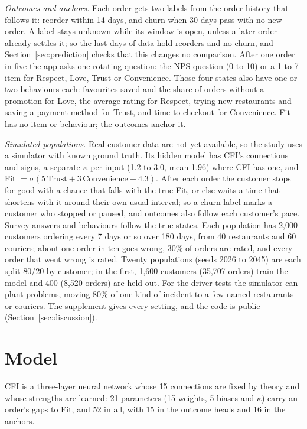 \documentclass[10pt,twocolumn,letterpaper]{article}
\newcommand{\secref}[1]{Section~\mbox{\ref{#1}}}
\newcommand{\runin}[1]{\textit{#1}\hspace{0.4em}}
\begin{document}
\runin{Outcomes and anchors.} Each order gets two labels from the order history that follows it: reorder within 14 days, and churn when 30 days pass with no new order. A label stays unknown while its window is open, unless a later order already settles it; so the last days of data hold reorders and no churn, and \secref{sec:prediction} checks that this changes no comparison. After one order in five the app asks one rotating question: the NPS question (0 to 10) or a 1-to-7 item for Respect, Love, Trust or Convenience. Those four states also have one or two behaviours each: favourites saved and the share of orders without a promotion for Love, the average rating for Respect, trying new restaurants and saving a payment method for Trust, and time to checkout for Convenience. Fit has no item or behaviour; the outcomes anchor it.

\runin{Simulated populations.} Real customer data are not yet available, so the study uses a simulator with known ground truth. Its hidden model has CFI's connections and signs, a separate $\kappa$ per input (1.2 to 3.0, mean 1.96) where CFI has one, and Fit $= \sigma(5\,\text{Trust} + 3\,\text{Convenience} - 4.3)$. After each order the customer stops for good with a chance that falls with the true Fit, or else waits a time that shortens with it around their own usual interval; so a churn label marks a customer who stopped or paused, and outcomes also follow each customer's pace. Survey answers and behaviours follow the true states. Each population has 2,000 customers ordering every 7 days or so over 180 days, from 40 restaurants and 60 couriers; about one order in ten goes wrong, 30\% of orders are rated, and every order that went wrong is rated. Twenty populations (seeds 2026 to 2045) are each split 80/20 by customer; in the first, 1,600 customers (35,707 orders) train the model and 400 (8,520 orders) are held out. For the driver tests the simulator can plant problems, moving 80\% of one kind of incident to a few named restaurants or couriers. The supplement gives every setting, and the code is public (\secref{sec:discussion}).

\section{Model}\label{sec:model}

CFI is a three-layer neural network whose 15 connections are fixed by theory and whose strengths are learned: 21 parameters (15 weights, 5 biases and $\kappa$) carry an order's gaps to Fit, and 52 in all, with 15 in the outcome heads and 16 in the anchors.
\end{document}
